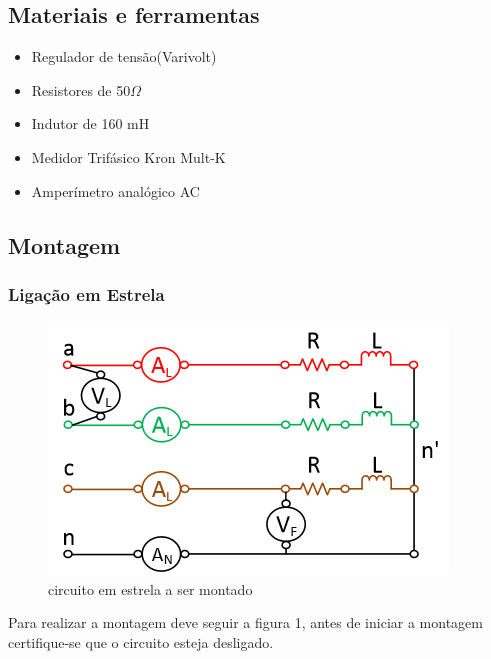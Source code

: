 \documentclass[a4paper, 12pt]{article}
\begin{document}
    \subsection{Materiais e ferramentas} 
        \begin{itemize}
            \item Regulador de tensão(Varivolt)
            \item Resistores de 50\(\Omega\)
            \item Indutor de 160 mH
            \item Medidor Trifásico Kron Mult-K 
            \item Amperímetro analógico AC
        \end{itemize}
    \subsection{Montagem}
    \subsubsection{Ligação em Estrela}
       \begin{figure}[H]
            \centering %
            \includegraphics[]{FOTO1.png} 
            \caption{circuito em estrela a ser montado}
            \label{figura:qualquernome}
        \end{figure}
        Para realizar a montagem deve seguir a figura 1, antes de iniciar a montagem certifique-se que o circuito esteja desligado.
        
\end{document}
